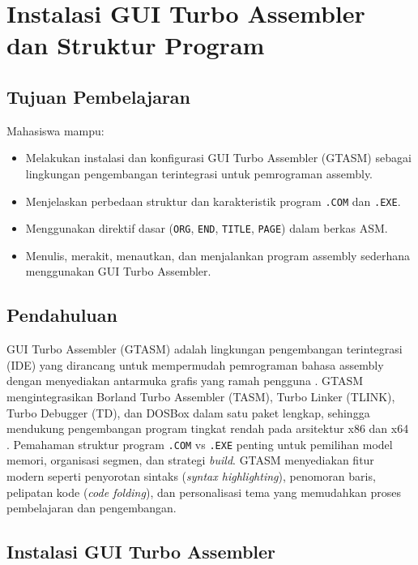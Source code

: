 \documentclass[../main.tex]{subfiles}
\begin{document}
\chapter{Instalasi GUI Turbo Assembler dan Struktur Program}

    \section{Tujuan Pembelajaran}
        Mahasiswa mampu:
        \begin{itemize}
            \item Melakukan instalasi dan konfigurasi GUI Turbo Assembler (GTASM) sebagai \\
            lingkungan pengembangan terintegrasi untuk pemrograman assembly.
            \item Menjelaskan perbedaan struktur dan karakteristik program \texttt{.COM} dan \texttt{.EXE}.
            \item Menggunakan direktif dasar (\texttt{ORG}, \texttt{END}, \texttt{TITLE}, \texttt{PAGE}) dalam berkas ASM.
            \item Menulis, merakit, menautkan, dan menjalankan program assembly sederhana menggunakan GUI Turbo Assembler.
        \end{itemize}

    \section{Pendahuluan}
        GUI Turbo Assembler (GTASM) adalah lingkungan pengembangan terintegrasi (IDE) yang dirancang untuk mempermudah pemrograman bahasa assembly dengan menyediakan antarmuka grafis yang ramah pengguna \cite{borland1990tasm}. GTASM mengintegrasikan Borland Turbo Assembler (TASM), Turbo Linker (TLINK), Turbo Debugger (TD), dan DOSBox dalam satu paket lengkap, sehingga mendukung pengembangan program tingkat rendah pada arsitektur x86 dan x64 \cite{dosbox_manual}. Pemahaman struktur program \texttt{.COM} vs \texttt{.EXE} penting untuk pemilihan model memori, organisasi segmen, dan strategi \textit{build}. GTASM menyediakan fitur modern seperti penyorotan sintaks (\textit{syntax highlighting}), penomoran baris, pelipatan kode (\textit{code folding}), dan personalisasi tema yang memudahkan proses pembelajaran dan pengembangan.

    \section{Instalasi GUI Turbo Assembler}
\end{document}
